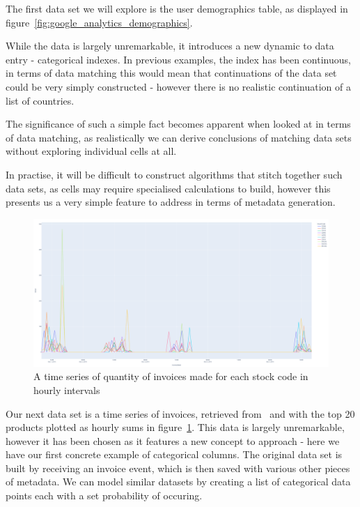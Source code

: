 \bigbreak
The first data set we will explore is the user demographics table, as displayed in
figure~\ref{fig:google_analytics_demographics}.

While the data is largely unremarkable, it introduces a new dynamic to data entry - categorical indexes.
In previous examples, the index has been continuous, in terms of data matching this would mean that continuations of the
data set could be very simply constructed - however there is no realistic continuation of a list of countries.

The significance of such a simple fact becomes apparent when looked at in terms of data matching, as realistically we
can derive conclusions of matching data sets without exploring individual cells at all.

In practise, it will be difficult to construct algorithms that stitch together such data sets, as cells may require
specialised calculations to build, however this presents us a very simple feature to address in terms of metadata
generation.


\begin{figure}
    \centering
    \includegraphics[width=12cm]{figures/real_data_examples/real_data_invoice_timeseries}
    \caption{A time series of quantity of invoices made for each stock code in hourly intervals}
    \label{fig:invoice_timeseries}
\end{figure}

Our next data set is a time series of invoices, retrieved from~\cite{UCIMLRepo} and with the top 20 products plotted
as hourly sums in figure~\ref{fig:invoice_timeseries}.
This data is largely unremarkable, however it has been chosen as it features a new concept to approach - here we have
our first concrete example of categorical columns.
The original data set is built by receiving an invoice event, which is then saved with various other pieces of metadata.
We can model similar datasets by creating a list of categorical data points each with a set probability of occuring.


